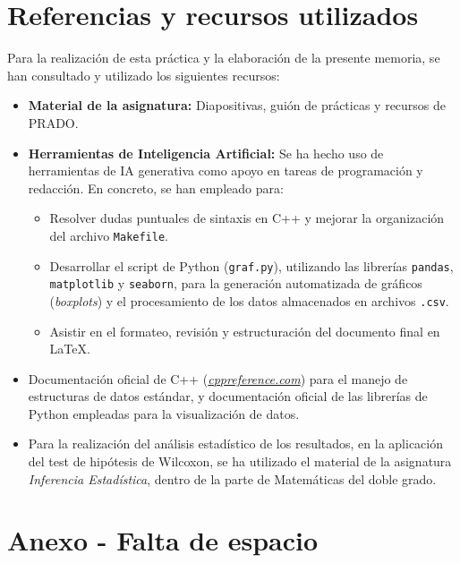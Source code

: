 \documentclass[a4paper,12pt]{article}%
\begin{document}
\newpage
\section{Referencias y recursos utilizados}

Para la realización de esta práctica y la elaboración de la presente memoria, se han consultado y utilizado los siguientes recursos:

\begin{itemize}
	\item \textbf{Material de la asignatura:} Diapositivas, guión de prácticas y recursos de PRADO.
	
	\item \textbf{Herramientas de Inteligencia Artificial:} Se ha hecho uso de herramientas de IA generativa como apoyo en tareas de programación y redacción. En concreto, se han empleado para:
	\begin{itemize}
		\item Resolver dudas puntuales de sintaxis en C++ y mejorar la organización del archivo \texttt{Makefile}.
		\item Desarrollar el script de Python (\texttt{graf.py}), utilizando las librerías \texttt{pandas}, \texttt{matplotlib} y \texttt{seaborn}, para la generación automatizada de gráficos (\textit{boxplots}) y el procesamiento de los datos almacenados en archivos \texttt{.csv}.
		\item Asistir en el formateo, revisión y estructuración del documento final en \LaTeX.
	\end{itemize}
	
	\item Documentación oficial de C++ (\href{https://cppreference.com}{\textit{cppreference.com}}) para el manejo de estructuras de datos estándar, y documentación oficial de las librerías de Python empleadas para la visualización de datos.
	
	\item Para la realización del análisis estadístico de los resultados, en la aplicación del test de hipótesis de Wilcoxon, se ha utilizado el material de la asignatura \textit{Inferencia Estadística},  dentro de la parte de Matemáticas del doble grado.
\end{itemize}

\newpage
\section{Anexo - Falta de espacio}
\end{document}
